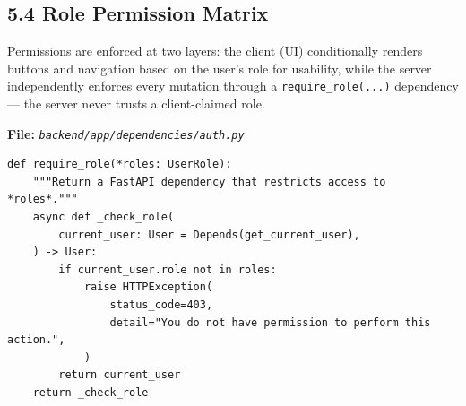 \documentclass[11pt]{article}
\newcommand{\filelabel}[1]{\textbf{File:} \textit{\texttt{#1}}\par\vspace{2pt}}
\begin{document}
\subsection{5.4 Role Permission Matrix}

Permissions are enforced at two layers: the client (UI) conditionally renders buttons and navigation based on the user's role for usability, while the server independently enforces every mutation through a \texttt{require\_role(...)} dependency --- the server never trusts a client-claimed role.

\filelabel{backend/app/dependencies/auth.py}
\begin{lstlisting}
def require_role(*roles: UserRole):
    """Return a FastAPI dependency that restricts access to *roles*."""
    async def _check_role(
        current_user: User = Depends(get_current_user),
    ) -> User:
        if current_user.role not in roles:
            raise HTTPException(
                status_code=403,
                detail="You do not have permission to perform this action.",
            )
        return current_user
    return _check_role
\end{lstlisting}
\end{document}

